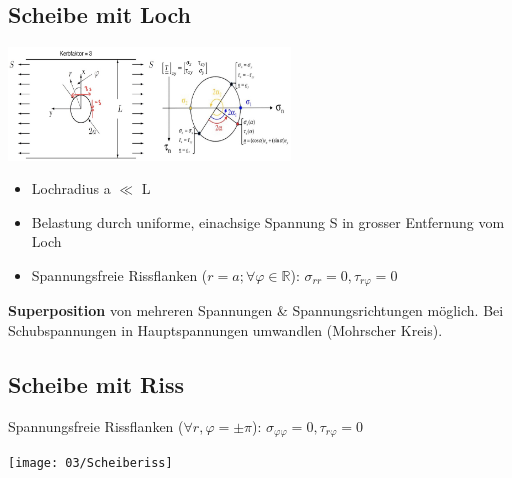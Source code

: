     \subsection{Scheibe mit Loch}
    \vspace{-0.5mm}
        \begin{center}
            \includegraphics[width=\linewidth, height=30mm]{images/03/mohr_and_loch.jpeg}
        \end{center}
        \vspace{-3mm}
        \begin{itemize}
            \item Lochradius a $\ll$ L
            \item Belastung durch uniforme, einachsige Spannung S in grosser Entfernung vom Loch
            \item Spannungsfreie Rissflanken ($r = a; \forall\varphi\in\mathbb{R} $): $\sigma_{rr}=0, \tau_{r\varphi}=0$
        \end{itemize}
        \vspace{-2mm}
        \textbf{Superposition} von mehreren Spannungen \& Spannungsrichtungen möglich. Bei Schubspannungen in Hauptspannungen umwandlen (Mohrscher Kreis).
    \subsection{Scheibe mit Riss}
        Spannungsfreie Rissflanken ($\forall r, \varphi=\pm\pi$): $\sigma_{\varphi\varphi}=0, \tau_{r\varphi}=0$
        \begin{center}
            \vspace{-2mm}
            \texttt{[image: 03/Scheiberiss]}
        \end{center}